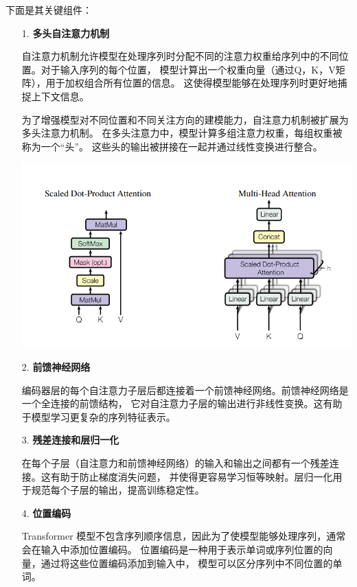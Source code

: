 \documentclass[11pt]{article}
\begin{document}
            下面是其关键组件：
            \begin{enumerate}
                \setlength{\parindent}{2em}
                \item [1. ]\textbf{多头自注意力机制}\par
                自注意力机制允许模型在处理序列时分配不同的注意力权重给序列中的不同位置。对于输入序列的每个位置，
                模型计算出一个权重向量（通过Q，K，V矩阵），用于加权组合所有位置的信息。
                这使得模型能够在处理序列时更好地捕捉上下文信息。

                为了增强模型对不同位置和不同关注方向的建模能力，自注意力机制被扩展为多头注意力机制。
                在多头注意力中，模型计算多组注意力权重，每组权重被称为一个“头”。
                这些头的输出被拼接在一起并通过线性变换进行整合。

                \begin{center}
                    \includegraphics[scale=0.9]{graph/transformer2.png}
                \end{center}

                \item [2. ]\textbf{前馈神经网络}\par
                编码器层的每个自注意力子层后都连接着一个前馈神经网络。前馈神经网络是一个全连接的前馈结构，
                它对自注意力子层的输出进行非线性变换。这有助于模型学习更复杂的序列特征表示。

                \item [3. ]\textbf{残差连接和层归一化}\par
                在每个子层（自注意力和前馈神经网络）的输入和输出之间都有一个残差连接。这有助于防止梯度消失问题，
                并使得更容易学习恒等映射。层归一化用于规范每个子层的输出，提高训练稳定性。

                \item [4. ]\textbf{位置编码}\par
                Transformer 模型不包含序列顺序信息，因此为了使模型能够处理序列，通常会在输入中添加位置编码。
                位置编码是一种用于表示单词或序列位置的向量，通过将这些位置编码添加到输入中，
                模型可以区分序列中不同位置的单词。


            \end{enumerate}
\end{document}
